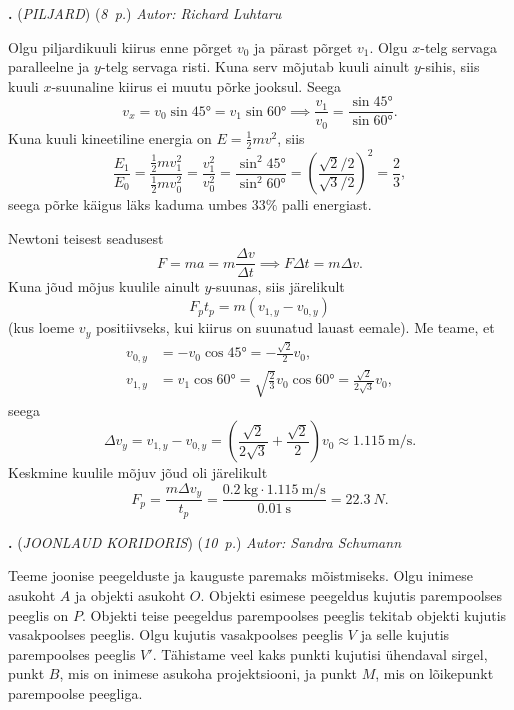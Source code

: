 \documentclass[11pt,a5paper]{article}
\newcommand{\numb}[1]{\vspace{5pt}\textbf{\large #1}}
\newcommand{\nimi}[1]{(\textsl{\small \uppercase{#1}})}
\newcommand{\punktid}[1]{(\emph{#1~p.})}
\newcounter{ylesanne}
\newcommand{\yl}[1]{\addtocounter{ylesanne}{1}\numb{\theylesanne.} \nimi{#1} \newblock{}}
\newcommand{\autor}[1]{\emph{Autor: #1}}%
\begin{document}
\yl{PILJARD}
\punktid{8} \autor{Richard Luhtaru}\par
\osa Olgu piljardikuuli kiirus enne põrget $v_0$ ja pärast põrget $v_1$. Olgu $x$-telg servaga paralleelne ja $y$-telg servaga risti. Kuna serv mõjutab kuuli ainult $y$-sihis, siis kuuli $x$-suunaline kiirus ei muutu põrke jooksul. Seega
\begin{equation*}
    v_x = v_0\sin\ang{45} = v_1\sin\ang{60} \implies \frac{v_1}{v_0} = \frac{\sin\ang{45}}{\sin\ang{60}}.
\end{equation*}
Kuna kuuli kineetiline energia on $E = \frac{1}{2}mv^2$, siis
\begin{equation*}
    \frac{E_1}{E_0} = \frac{\frac{1}{2}mv_1^2}{\frac{1}{2}mv_0^2} = \frac{v_1^2}{v_0^2} = \frac{\sin^2\ang{45}}{\sin^2\ang{60}} = \left(\frac{\sqrt{2}/2}{\sqrt{3}/2}\right)^2 = \frac{2}{3},
\end{equation*}
seega põrke käigus läks kaduma umbes $33\%$ palli energiast.

\osa Newtoni teisest seadusest
\begin{equation*}
    F = ma = m\frac{\Delta v}{\Delta t} \implies F\Delta t = m\Delta v.
\end{equation*}
Kuna jõud mõjus kuulile ainult $y$-suunas, siis järelikult
\begin{equation*}
    F_p t_p = m\left(v_{1,y}-v_{0,y}\right)
\end{equation*}
(kus loeme $v_y$ positiivseks, kui kiirus on suunatud lauast eemale). Me teame, et
\begin{align*}
    v_{0,y} &= -v_0 \cos\ang{45} = -\frac{\sqrt 2}{2}v_0,\\
    v_{1,y} &= v_1 \cos\ang{60} = \sqrt{\frac{2}{3}}v_0\cos\ang{60} = \frac{\sqrt 2}{2\sqrt 3}v_0,
\end{align*}
seega
\begin{equation*}
    \Delta v_y = v_{1,y}-v_{0,y} = \left(\frac{\sqrt 2}{2\sqrt 3} + \frac{\sqrt 2}{2}\right)v_0 \approx \SI{1.115}{\m\per\s}.
\end{equation*}
Keskmine kuulile mõjuv jõud oli järelikult
\begin{equation*}
    F_p = \frac{m\Delta v_y}{t_p} = \frac{\SI{0.2}{\kg}\cdot \SI{1.115}{\m\per\s}}{\SI{0.01}{\s}} = \SI{22.3}{N}.
\end{equation*}

\yl{Joonlaud koridoris}
\punktid{10} \autor{Sandra Schumann}

Teeme joonise peegelduste ja kauguste paremaks mõistmiseks. Olgu inimese asukoht $A$ ja objekti asukoht $O$. Objekti esimese peegeldus kujutis parempoolses peeglis on $P$. Objekti teise peegeldus parempoolses peeglis tekitab objekti kujutis vasakpoolses peeglis. Olgu kujutis vasakpoolses peeglis $V$ ja selle kujutis parempoolses peeglis $V'$. Tähistame veel kaks punkti kujutisi ühendaval sirgel, punkt $B$, mis on inimese asukoha projektsiooni, ja punkt $M$, mis on lõikepunkt parempoolse peegliga.
\end{document}

